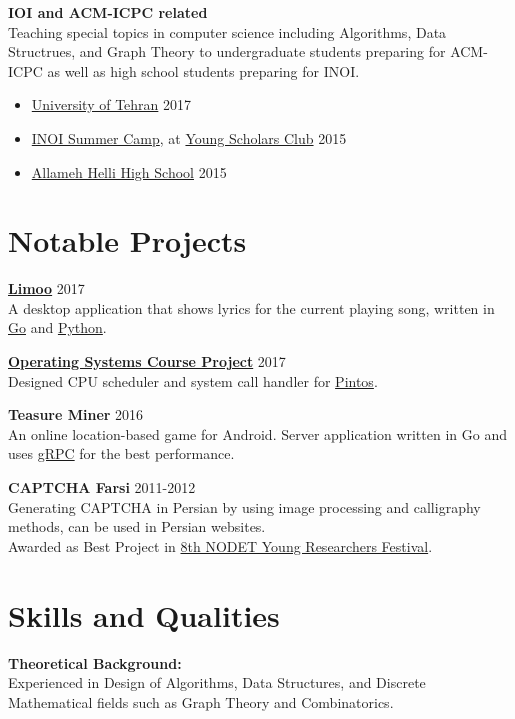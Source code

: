 \documentclass[margin]{res}
\begin{document}
\begin{resume}
    {\bf IOI and ACM-ICPC related}
    \\Teaching special topics in computer science including Algorithms, Data Structrues,
    and Graph Theory to undergraduate students preparing for ACM-ICPC as well as high school
    students preparing for INOI.
    	\begin{itemize}
		\item \href{http://ut.ac.ir/en}{University of Tehran} \hfill 2017
		\item \href{http://inoi.ir/}{INOI Summer Camp}, at \href{http://ysc.ac.ir/}{Young Scholars Club} \hfill 2015
	    \item \href{http://www.helli.ir/}{Allameh Helli High School} \hfill 2015
	\end{itemize}

\section{Notable Projects}
	{\bf \href{https://github.com/shayanh/limoo}{Limoo}} \hfill 2017
	\\A desktop application that shows lyrics for the current playing song, written in \href{https://github.com/shayanh/limoo-server}{Go} and \href{https://github.com/shayanh/limoo}{Python}.
	
	{\bf \href{https://github.com/shayanh/pintos}{Operating Systems Course Project}} \hfill 2017
	\\Designed CPU scheduler and system call handler for \href{https://en.wikipedia.org/wiki/Pintos}{Pintos}.
	
	{\bf Teasure Miner} \hfill 2016
	\\An online location-based game for Android. Server application written in Go and uses \href{https://grpc.io/}{gRPC} for the best performance.
	
	{\bf CAPTCHA Farsi} \hfill 2011-2012
	\\Generating CAPTCHA in Persian by using image processing and calligraphy methods, can be used in Persian websites.
	\\Awarded as Best Project in \href{
	http://www.helli.ir/portal/content/تقدیر-از-دانش-آموزان-برترپژوهشگر	
	}{8th NODET Young Researchers Festival}.

\section{Skills and Qualities} 
    {\bf Theoretical Background:}
    \\Experienced in Design of Algorithms, Data Structures, and Discrete Mathematical fields such as Graph Theory and Combinatorics.


\end{resume}
\end{document}
